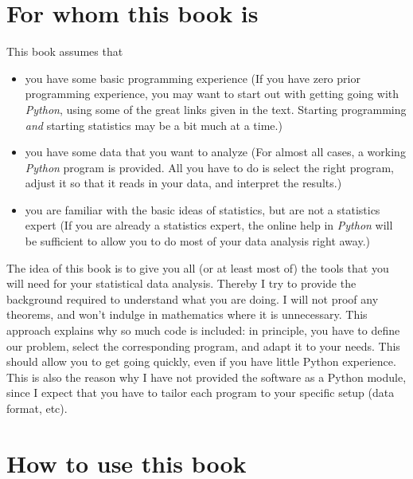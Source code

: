 \section*{For whom this book is}

This book assumes that

\begin{itemize}
  \item you have some basic programming experience (If you have zero prior programming experience, you may want to start out with getting going with \emph{Python}, using some of the great links given in the text. Starting programming \emph{and} starting statistics may be a bit much at a time.)
  \item you have some data that you want to analyze (For almost all cases, a working \emph{Python} program is provided. All you have to do is select the right program, adjust it so that it reads in your data, and interpret the results.)
  \item you are familiar with the basic ideas of statistics, but are not a statistics expert (If you are already a statistics expert, the online help in \emph{Python} will be sufficient to allow you to do most of your data analysis right away.)
\end{itemize}


The idea of this book is to give you all (or at least most of) the tools that you will need for your statistical data analysis. Thereby I try to provide the background required to understand what you are doing. I will not proof any theorems, and won't indulge in mathematics where it is unnecessary. This approach explains why so much code is included: in principle, you have to define our problem, select the corresponding program, and adapt it to your needs. This should allow you to get going quickly, even if you have little Python experience. This is also the reason why I have not provided the software as a Python module, since I expect that you have to tailor each program to your specific setup (data format, etc).

\section*{How to use this book}

